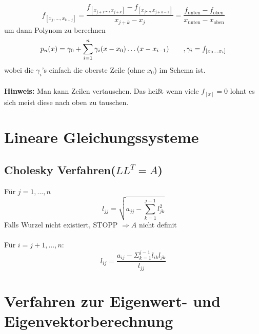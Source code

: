 \documentclass[
ngerman,
accentcolor=9c,%
type=intern,
marginpar=false
]{tudapub}
\begin{document}
            \begin{equation*}
                f_{[x_j,\dots,x_{k+j}]} = \dfrac{f_{[x_{j+1} \dots, x_{j+k}]} - f_{[x_{j} \dots, x_{j+k-1}]}}{x_{j+k} - x_j} = \dfrac{f_{\text{unten}} - f_{\text{oben}}}{x_{\text{unten}} - x_{\text{oben}}}
            \end{equation*}
            um dann Polynom zu berechnen
            \begin{equation*}
                p_n(x) = \gamma_0 + \sum_{i=1}^{n} \gamma_i (x-x_0) \dots (x-x_{i-1}) \tag*{$, \gamma_i = f_{[x_0 \dots x_i]}$}
            \end{equation*}
            wobei die $\gamma_i$'s einfach die oberste Zeile (ohne $x_0$) im Schema ist.\\
            \\
            \textbf{Hinweis:} Man kann Zeilen vertauschen. Das heißt wenn viele $f_{[x]} = 0$ lohnt es sich meist diese nach oben zu tauschen.

    \newpage
    \section{Lineare Gleichungssysteme}
        \subsection{Cholesky Verfahren\hspace{1em}($LL^T = A$)}
            Für $j= 1,\dots ,n$
            \begin{equation*}
                l_{jj} =\sqrt{a_{jj}-\sum^{j-1}_{k=1}l_{jk}^2}
            \end{equation*}
            Falls Wurzel nicht existiert, STOPP $\Rightarrow A$ nicht definit\\
            \\
            \hspace{20mm} Für $i=j+1,\dots,n:$
            \begin{equation*}
                l_{ij} = \dfrac{a_{ij}-\Sigma_{k=1}^{j-1}l_{ik}l_{jk}}{l_{jj}}
            \end{equation*}

    \newpage
    \section{Verfahren zur Eigenwert- und Eigenvektorberechnung}
\end{document}
